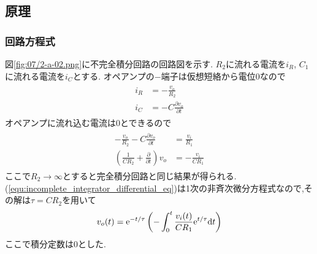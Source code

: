 \subsection{原理}
\subsubsection{回路方程式}
図\ref{fig:07/2-a-02.png}に不完全積分回路の回路図を示す.
$R_2$に流れる電流を$i_R$, $C_1$に流れる電流を$i_C$とする.
オペアンプの$-$端子は仮想短絡から電位0なので
\begin{align}
  \begin{split}
    i_R&=-\frac{v_o}{R_2}\\
    i_C&=-C\frac{\partial v_o}{\partial t}
  \end{split}
\end{align}
オペアンプに流れ込む電流は0とできるので
\begin{align}
  \begin{split}
    \label{equ:incomplete_integrator_differential_eq}
    -\frac{v_o}{R_2}-C\frac{\partial v_o}{\partial t}&=\frac{v_i}{R_1}\\
    \left(\frac{1}{CR_2}+\frac{\partial}{\partial t}\right)v_o&=-\frac{v_i}{CR_1}
  \end{split}
\end{align}
ここで$R_2\rightarrow\infty$とすると完全積分回路と同じ結果が得られる.
(\ref{equ:incomplete_integrator_differential_eq})は1次の非斉次微分方程式なので,その解は$\tau=CR_2$を用いて
\begin{align}
  \label{equ:incomplete_integrator_vo}
  v_o(t)={\rm e}^{-t/\tau}\left(-\int^t_0\frac{v_i(t)}{CR_1}{\rm e}^{t/\tau}{\rm d}t\right)
\end{align}
ここで積分定数は0とした.
